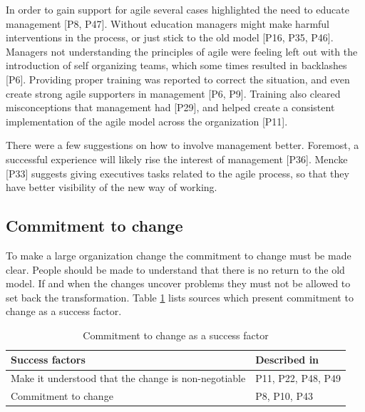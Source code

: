 
In order to gain support for agile several cases highlighted the need to educate
management [P8, P47].
Without education managers might make harmful interventions in the process, or
just stick to the old model [P16, P35, P46].
Managers not understanding the principles of agile were feeling left out with
the introduction of self organizing teams, which some times resulted in
backlashes [P6]. Providing proper training was reported to correct the
situation, and even create strong agile supporters in management [P6, P9].
Training also cleared misconceptions that management had [P29], and helped
create a consistent implementation of the agile model across the organization
[P11].

There were a few suggestions on how to involve management better. Foremost, a
successful experience will likely rise the interest of management [P36].
Mencke [P33] suggests giving executives tasks related to the agile process,
so that they have better visibility of the new way of working. 


\subsection{Commitment to change}

To make a large organization change the commitment to change must be made clear.
People should be made to understand that there is no return to the old model.
If and when the changes uncover problems they must not be allowed to set back
the transformation. Table \ref{table:success_commitment} lists sources which
present commitment to change as a success factor.

\begin{table}[h]
    \centering
    \begin{tabular}{ >{\raggedright\arraybackslash}p{}
                     >{\raggedright\arraybackslash}p{} }
        \toprule
        Success factors  &  Described in \\
        \midrule
        Make it understood that the change is non-negotiable  &
                P11, P22, P48, P49  \\
        Commitment to change  &
                P8, P10, P43  \\
        \bottomrule
    \end{tabular}
    \caption{Commitment to change as a success factor}
    \label{table:success_commitment}
\end{table}

